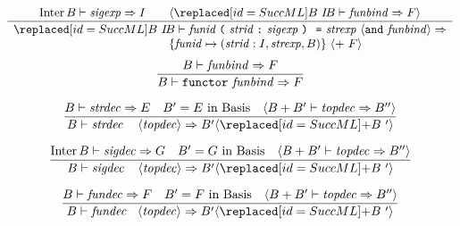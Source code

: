 %
\begin{equation}        %
\frac{
      \Inter\B\ts\sigexp\ra\I\qquad
      \langle\REPL{\B\ }{\IB}\ts\funbind\ra\F\rangle
     }
     {
      \begin{array}{c}
       \REPL{\B\ }{\IB}\ts\barefunstrbinder\ \optfunbinda\ra\\
       \qquad\qquad \qquad
              \{\funid\mapsto(\strid:\I,\strexp,\B)\}
              \ \langle +\ \F\rangle
      \end{array}
     }\index{62.5}
\end{equation}
\oldpagebreak
{}
\begin{equation}        %
\frac{ \B\ts\funbind\ra\F }
     { \B\ts\singfundec\ra\F }\index{63.1}
\end{equation}

\begin{equation}        %
\frac{\B\ts\strdec\ra\E\quad\B' =\E\ \In\ \Basis\quad\langle \B+\B'\ts\topdec\ra\B''\rangle }
     {\B\ts\strdecintopdec\ra\B'\langle\REPL{+\B\ }{'}\rangle
     }\index{63.2}
\end{equation}

\vspace{6pt}
\begin{equation}        %
\frac{\Inter\B\ts\sigdec\ra\G\quad B' = \G\ \In\ \Basis\quad
       \langle \B + \B'\ts\topdec\ra\B''\rangle}
     {\B\ts\sigdecintopdec\ra \B'\langle\REPL{+\B\ }{'}\rangle 
     }
\end{equation}

\vspace{6pt}
\begin{equation}        %
\frac{\B\ts\fundec\ra\F\quad \B' = \F\ \In\ \Basis\quad
       \langle \B + \B'\ts\topdec\ra\B''\rangle}
     {\B\ts\fundecintopdec\ra\B'\langle\REPL{+\B\ }{'}\rangle
     }
\end{equation}



